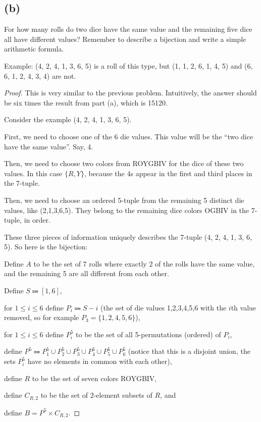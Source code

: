 \documentclass[14pt]{extarticle}
\begin{document}
\subsection{(b)}
For how many rolls do two dice have the same value and the remaining five dice all have different values? Remember to describe a bijection and write a simple arithmetic formula.

Example: (4, 2, 4, 1, 3, 6, 5) is a roll of this type, but (1, 1, 2, 6, 1, 4, 5) and (6, 6, 1, 2, 4, 3, 4) are not.
\begin{proof}
This is very similar to the previous problem. Intuitively, the answer should be six times the result from part (a), which is 15120. 

Consider the example (4, 2, 4, 1, 3, 6, 5).

First, we need to choose one of the 6 die values. This value will be the ``two dice have the same value''. Say, 4.

Then, we need to choose two colors from ROYGBIV for the dice of these two values. In this case $\{R,Y\}$, because the 4s appear in the first and third places in the 7-tuple.

Then, we need to choose an ordered 5-tuple from the remaining 5 distinct die values, like (2,1,3,6,5). They belong to the remaining dice colors OGBIV in the 7-tuple, in order.

These three pieces of information uniquely describes the 7-tuple (4, 2, 4, 1, 3, 6, 5). So here is the bijection:

Define $A$ to be the set of 7 rolls where exactly 2 of the rolls have the same value, and the remaining 5 are all different from each other. 

Define $S \Coloneqq [1,6]$, 

for $1 \leq i \leq 6$ define $P_i \Coloneqq S - i$ (the set of die values 1,2,3,4,5,6 with the $i$th value removed, so for example $P_3 = \{1,2,4,5,6\}$),

for $1 \leq i \leq 6$ define $P_i^5$ to be the set of all 5-permutations (ordered) of $P_i$,

define $P^5 \Coloneqq P_1^5 \cup P_2^5 \cup P_3^5 \cup P_4^5 \cup P_5^5 \cup P_6^5$ (notice that this is a disjoint union, the sets $P_i^5$ have no elements in common with each other),

define $R$ to be the set of seven colors ROYGBIV,

define $C_{R, 2}$ to be the set of 2-element subsets of $R$, and 

define $B = P^5 \times C_{R,2}$.


\end{proof}
\end{document}
